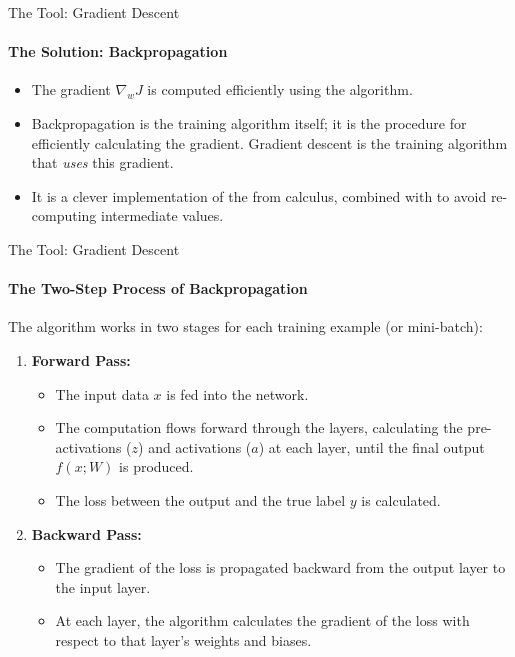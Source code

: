 \begin{frame}{The Tool: Gradient Descent}
    \framesubtitle{The Solution: Backpropagation}
    \begin{itemize}
        \item The gradient $\nabla_{w}J$ is computed efficiently using the  algorithm.
        \item Backpropagation is  the training algorithm itself; it is the procedure for efficiently calculating the gradient. Gradient descent is the training algorithm that \emph{uses} this gradient.
        \item It is a clever implementation of the  from calculus, combined with  to avoid re-computing intermediate values.
    \end{itemize}
\end{frame}

\begin{frame}{The Tool: Gradient Descent}
    \framesubtitle{The Two-Step Process of Backpropagation}
    The algorithm works in two stages for each training example (or mini-batch):
    \begin{enumerate}
        \item \textbf{Forward Pass:}
        \begin{itemize}
            \item The input data $x$ is fed into the network.
            \item The computation flows forward through the layers, calculating the pre-activations ($z$) and activations ($a$) at each layer, until the final output $f(x;W)$ is produced.
            \item The loss between the output and the true label $y$ is calculated.
        \end{itemize}
        \item \textbf{Backward Pass:}
        \begin{itemize}
            \item The gradient of the loss is propagated backward from the output layer to the input layer.
            \item At each layer, the algorithm calculates the gradient of the loss with respect to that layer's weights and biases.
        \end{itemize}
    \end{enumerate}
\end{frame}